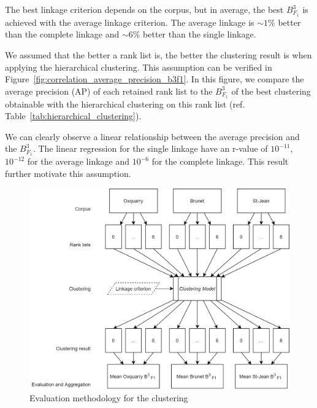 The best linkage criterion depends on the corpus, but in average, the best $B^3_{F_1}$ is achieved with the average linkage criterion.
The average linkage is $\sim 1\%$ better than the complete linkage and $\sim 6\%$ better than the single linkage.

We assumed that the better a rank list is, the better the clustering result is when applying the hierarchical clustering.
This assumption can be verified in Figure~\ref{fig:correlation_average_precision_b3f1}.
In this figure, we compare the average precision (AP) of each retained rank list to the $B^3_{F_1}$ of the best clustering obtainable with the hierarchical clustering on this rank list (ref. Table~\ref{tab:hierarchical_clustering}).

We can clearly observe a linear relationship between the average precision and the $B^3_{F_1}$.
The linear regression for the single linkage have an r-value of $10^{-11}$, $10^{-12}$ for the average linkage and $10^{-6}$ for the complete linkage.
This result further motivate this assumption.

\begin{figure}
  \centering
  \caption{Evaluation methodology for the clustering}
  \label{fig:clustering_evaluation_methodology}
  \includegraphics[width=0.7\linewidth]{img/clustering_evaluation_methodology.png}
\end{figure}


